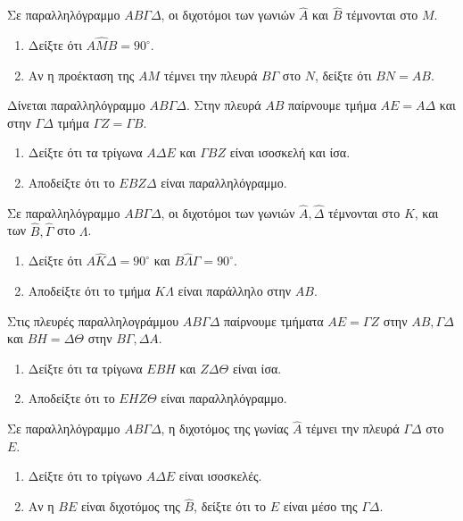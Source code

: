 \documentclass[11pt,a4paper,modern]{FFExercises}
\begin{document}
\askhsh Σε παραλληλόγραμμο $ΑΒ\varGamma\Delta$, οι διχοτόμοι των γωνιών $\hat{Α}$ και $\hat{Β}$ τέμνονται στο $Μ$.
\begin{enumerate}[label=\roman*)]
    \item Δείξτε ότι $Α\hat{Μ}Β = 90^\circ$.
    \item Αν η προέκταση της $ΑΜ$ τέμνει την πλευρά $Β\varGamma$ στο $Ν$, δείξτε ότι $ΒΝ = ΑΒ$.
\end{enumerate}

\askhsh Δίνεται παραλληλόγραμμο $ΑΒ\varGamma\Delta$. Στην πλευρά $ΑΒ$ παίρνουμε τμήμα $ΑΕ = Α\Delta$ και στην $\varGamma\Delta$ τμήμα $\varGamma Ζ = \varGamma Β$.
\begin{enumerate}[label=\roman*)]
    \item Δείξτε ότι τα τρίγωνα $Α\Delta Ε$ και $\varGamma Β Ζ$ είναι ισοσκελή και ίσα.
    \item Αποδείξτε ότι το $ΕΒΖ\Delta$ είναι παραλληλόγραμμο.
\end{enumerate}

\askhsh Σε παραλληλόγραμμο $ΑΒ\varGamma\Delta$, οι διχοτόμοι των γωνιών $\hat{Α}, \hat{\Delta}$ τέμνονται στο $Κ$, και των $\hat{Β}, \hat{\varGamma}$ στο $Λ$.
\begin{enumerate}[label=\roman*)]
    \item Δείξτε ότι $Α\hat{Κ}\Delta = 90^\circ$ και $Β\hat{Λ}\varGamma = 90^\circ$.
    \item Αποδείξτε ότι το τμήμα $ΚΛ$ είναι παράλληλο στην $ΑΒ$.
\end{enumerate}

\askhsh Στις πλευρές παραλληλογράμμου $ΑΒ\varGamma\Delta$ παίρνουμε τμήματα $ΑΕ = \varGamma Ζ$ στην $ΑΒ, \varGamma\Delta$ και $ΒΗ = \Delta \Theta$ στην $Β\varGamma, \Delta Α$.
\begin{enumerate}[label=\roman*)]
    \item Δείξτε ότι τα τρίγωνα $ΕΒΗ$ και $Ζ\Delta\Theta$ είναι ίσα.
    \item Αποδείξτε ότι το $ΕΗΖ\Theta$ είναι παραλληλόγραμμο.
\end{enumerate}

\askhsh Σε παραλληλόγραμμο $ΑΒ\varGamma\Delta$, η διχοτόμος της γωνίας $\hat{Α}$ τέμνει την πλευρά $\varGamma\Delta$ στο $Ε$.
\begin{enumerate}[label=\roman*)]
    \item Δείξτε ότι το τρίγωνο $Α\Delta Ε$ είναι ισοσκελές.
    \item Αν η $ΒΕ$ είναι διχοτόμος της $\hat{Β}$, δείξτε ότι το $Ε$ είναι μέσο της $\varGamma\Delta$.
\end{enumerate}
\end{document}
